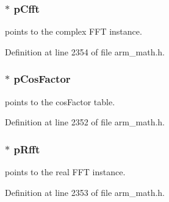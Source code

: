 \subsubsection[{\texorpdfstring{p\+Cfft}{pCfft}}]{$\ast$ p\+Cfft}\hypertarget{structarm__dct4__instance__q15_ae0ac7c3a89699793fc0dac960db7f056}{}\label{structarm__dct4__instance__q15_ae0ac7c3a89699793fc0dac960db7f056}
points to the complex F\+FT instance. 

Definition at line 2354 of file arm\+\_\+math.\+h.

\subsubsection[{\texorpdfstring{p\+Cos\+Factor}{pCosFactor}}]{$\ast$ p\+Cos\+Factor}\hypertarget{structarm__dct4__instance__q15_a9d858d313cbba67ceaef9704bc9c43b0}{}\label{structarm__dct4__instance__q15_a9d858d313cbba67ceaef9704bc9c43b0}
points to the cos\+Factor table. 

Definition at line 2352 of file arm\+\_\+math.\+h.

\subsubsection[{\texorpdfstring{p\+Rfft}{pRfft}}]{$\ast$ p\+Rfft}\hypertarget{structarm__dct4__instance__q15_aea6aa42c838f2b22c8c31e9e259b8d75}{}\label{structarm__dct4__instance__q15_aea6aa42c838f2b22c8c31e9e259b8d75}
points to the real F\+FT instance. 

Definition at line 2353 of file arm\+\_\+math.\+h.

